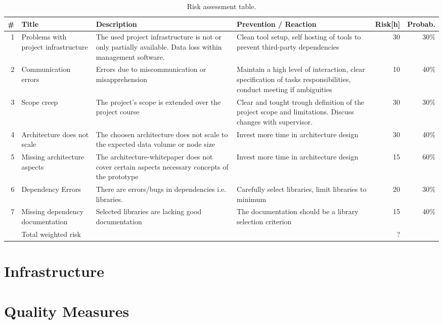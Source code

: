 \documentclass[a4paper]{article}
\begin{document}
\begin{sidewaystable}
	\centering
	\caption{Risk assessment table.}
	\label{tbl:project-risks}
	\begin{tabu}{r l X X r r}
		\hline
		\# & Title & Description & Prevention / Reaction & Risk[h] & Probab. \\ \hline
		
		1 & Problems with project infrastructure
		  & The used project infrastructure is not or only partially available. Data loss within management software.
		  & Clean tool setup, self hosting of tools to prevent third-party dependencies
		  & 30 & 30\% \\
		
		2 & Communication errors
		  & Errors due to miscommunication or misapprehension
		  & Maintain a high level of interaction, clear specification of tasks responsibilities, conduct meeting if ambiguities
		  & 10 & 40\% \\

		3 & Scope creep
		  & The project's scope is extended over the project course
		  & Clear and tought trough definition of the project scope and limitations. Discuss changes with supervisor.
		  & 30 & 30\% \\
		
		4 & Architecture does not scale
		  & The choosen architecture does not scale to the expected data volume or node size
		  & Invest more time in architecture design
		  & 30 & 40\% \\

		5 & Missing architecture aspects
		  & The architecture-whitepaper does not cover certain aspects necessary concepts of the prototype
		  & Invest more time in architecture design
		  & 15 & 60\% \\
		
		6 & Dependency Errors
		  & There are errors/bugs in dependencies i.e. libraries.
		  & Carefully select libraries, limit libraries to minimum
		  & 20 & 30\% \\

		7 & Missing dependency documentation
		  & Selected libraries are lacking good documentation
		  & The documentation should be a library selection criterion
		  & 15 & 40\% \\
		
		\hline
		& Total weighted risk & & & ? &\\%
		\hline
	\end{tabu}
\end{sidewaystable}


\section{Infrastructure}

\section{Quality Measures}



\end{document}
